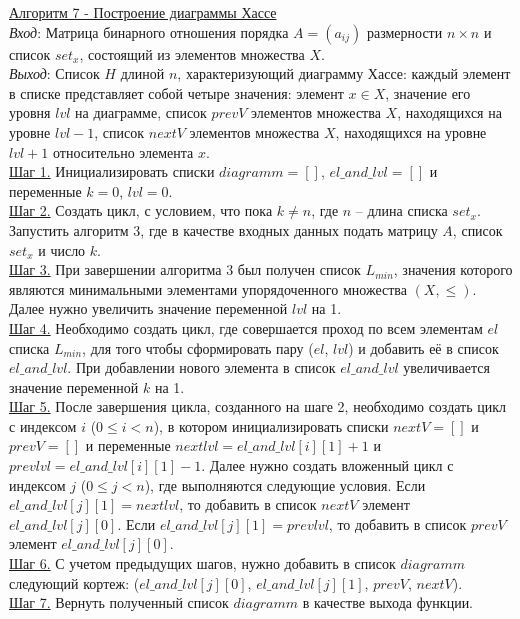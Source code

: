 \documentclass[bachelor, och, labwork]{shiza}
\begin{document}
        \underline{Алгоритм 7 - Построение диаграммы Хассе}\\
            \textit{Вход}: Матрица бинарного отношения порядка $A = (a_{ij})$ размерности $n \times n$ и список $set_x$, 
            состоящий из элементов множества $X$.\\
            \textit{Выход}: Список $H$ длиной $n$, характеризующий диаграмму Хассе: каждый элемент в списке представляет
            собой четыре значения: элемент $x \in X$, значение его уровня $lvl$ на диаграмме, список $prevV$ элементов множества
            $X$, находящихся на уровне $lvl - 1$, список $nextV$ элементов множества $X$, находящихся на уровне $lvl + 1$ относительно
            элемента $x$. \\
            \underline{Шаг 1.} Инициализировать списки $diagramm = []$, $el\_and\_lvl = []$ и переменные $k = 0$, $lvl = 0$.\\
            \underline{Шаг 2.} Создать цикл, с условием, что пока $k \neq n$, где $n$ -- длина списка $set_x$. Запустить алгоритм 3, где
            в качестве входных данных подать матрицу $A$, список $set_x$ и число $k$.\\
            \underline{Шаг 3.} При завершении алгоритма 3 был получен список $L_{min}$, значения которого являются
            минимальными элементами упорядоченного множества $(X, \leq)$. Далее нужно увеличить значение переменной $lvl$ на 1. \\    
            \underline{Шаг 4.} Необходимо создать цикл, где совершается проход по всем элементам $el$ списка $L_{min}$, для того чтобы
            сформировать пару ($el$, $lvl$) и добавить её в список $el\_and\_lvl$. При добавлении нового элемента в список $el\_and\_lvl$
            увеличивается значение переменной $k$ на 1.\\
            \underline{Шаг 5.} После завершения цикла, созданного на шаге 2, необходимо создать цикл с индексом $i$ ($0 \leq i < n$), в
            котором инициализировать списки $nextV = []$ и $prevV = []$ и переменные $nextlvl = el\_and\_lvl[i][1] + 1$ 
            и $prevlvl = el\_and\_lvl[i][1] - 1$. Далее нужно создать вложенный цикл с индексом $j$ ($0 \leq j < n$), где выполняются следующие
            условия. Если $el\_and\_lvl[j][1] = nextlvl$, то добавить в список $nextV$ элемент $el\_and\_lvl[j][0]$. Если 
            $el\_and\_lvl[j][1] = prevlvl$, то добавить в список $prevV$ элемент $el\_and\_lvl[j][0]$. \\
            \underline{Шаг 6.} С учетом предыдущих шагов, нужно добавить в список $diagramm$ следующий кортеж: ($el\_and\_lvl[j][0]$, $el\_and\_lvl[j][1]$,
            $prevV$, $nextV$). \\
            \underline{Шаг 7.} Вернуть полученный список $diagramm$ в качестве выхода функции.\\
\end{document}
